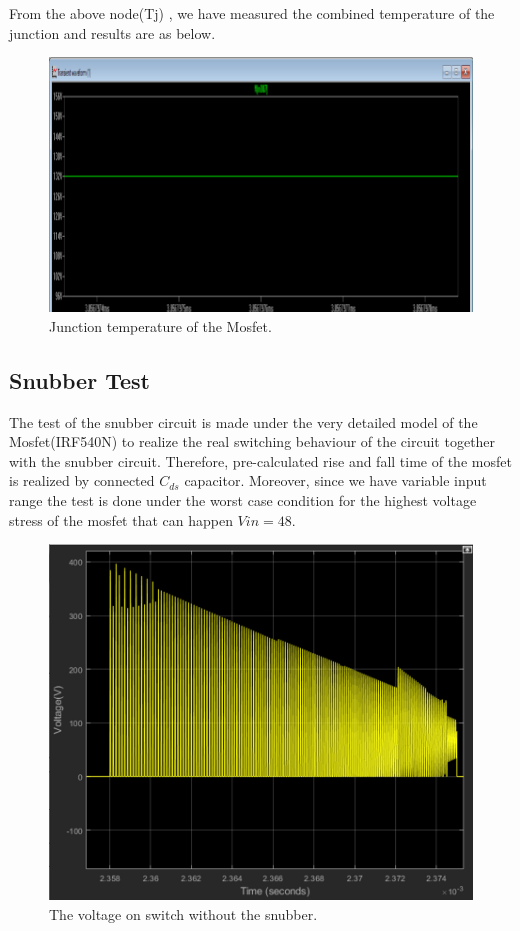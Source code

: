 \documentclass{article}
\begin{document}
From the above node(Tj) , we have measured the combined temperature of the junction
and results are as below.

\begin{figure}[H]
    \centering
    \includegraphics[scale=0.8]{t3.png}
    \caption{Junction temperature of the Mosfet.}
    \label{fig:my_label}
\end{figure}


\subsection{Snubber Test}

The test of the snubber circuit is made under the very detailed model of the Mosfet(IRF540N) to realize the real switching behaviour of the circuit together with the snubber circuit. Therefore, pre-calculated rise and fall time of the mosfet is realized by connected $C_{ds}$ capacitor. Moreover, since we have variable input range the test is done under the worst case condition for the highest voltage stress of the mosfet that can happen $Vin=48$.

\begin{figure}[H]
    \centering
    \includegraphics[scale=0.6]{wosnb.png}
    \caption{The voltage on switch without the snubber.}
    \label{fig:my_label}
\end{figure}
\end{document}
